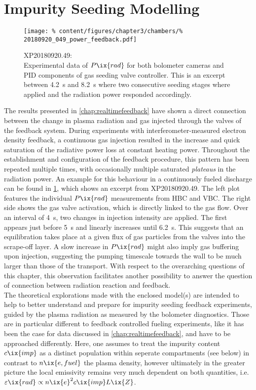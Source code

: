     \section{Impurity Seeding Modelling}\label{sec:seedmodel}%
%
        \begin{figure}[t]%
            \centering%
            \texttt{[image: \%
                content/figures/chapter3/chambers/\%
                20180920\_049\_power\_feedback.pdf]}%
            \caption{XP20180920.49:\\%
                Experimental data of $P\ix{rad}$ for both bolometer cameras and PID components of gas seeding valve controller. This is an excerpt between \SI{4.2}{\second} and \SI{8.2}{\second} where two consecutive seeding stages where applied and the radiation power responded accordingly.}\label{fig:chamber_expdata}%
        \end{figure}%
%
        The results presented in \cref{chap:realtimefeedback} have shown a direct connection between the change in plasma radiation and gas injected through the valves of the feedback system. During experiments with interferometer-measured electron density feedback, a continuous gas injection resulted in the increase and quick saturation of the radiative power loss at constant heating power. Throughout the establishment and configuration of the feedback procedure, this pattern has been repeated multiple times, with occasionally multiple saturated \textit{plateaus} in the radiation power. An example for this behaviour in a continuously fueled discharge can be found in \cref{fig:chamber_expdata}, which shows an excerpt from XP20180920.49. The left plot features the individual $P\ix{rad}$ measurements from HBC and VBC. The right side shows the gas valve activation, which is directly linked to the gas flow. Over an interval of \SI{4}{\second}, two changes in injection intensity are applied. The first appears just before \SI{5}{\second} and linearly increases until \SI{6.2}{\second}. This suggests that an equilibration takes place at a given flux of gas particles from the valves into the scrape-off layer. A slow increase in $P\ix{rad}$ might also imply gas buffering upon injection, suggesting the pumping timescale towards the wall to be much larger than those of the transport. With respect to the overarching questions of this chapter, this observation facilitates another possibility to answer the question of connection between radiation reaction and feedback.\\%
        The theoretical explorations made with the enclosed model(s) are intended to help to better understand and prepare for impurity seeding feedback experiments, guided by the plasma radiation as measured by the bolometer diagnostics. Those are in particular different to feedback controlled fueling experiments, like it has been the case for data discussed in \cref{chap:realtimefeedback}, and have to be approached differently. Here, one assumes to treat the impurity content $c\ix{imp}$ as a distinct population within seperate compartments (see below) in contrast to $n\ix{e, fuel}$ the plasma density, however ultimately in the greater picture the local emissivity remains very much dependent on both quantities, i.e. $\varepsilon\ix{rad}\propto n\ix{e}^{2}c\ix{imp}L\ix{Z}$.%

